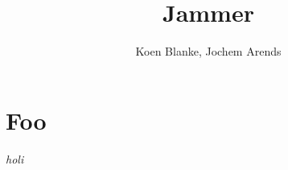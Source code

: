 \documentclass{paper}
\title{Jammer}
\author{Koen Blanke, Jochem Arends}
\begin{document}
\section{Foo}

\textit{holi}
\lipsum
\end{document}
